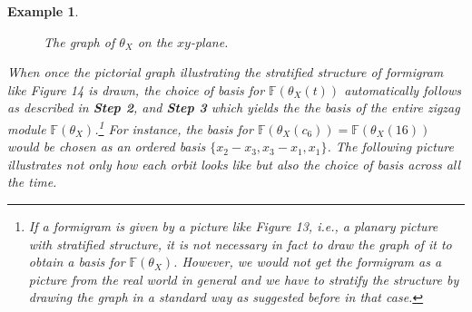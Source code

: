 \documentclass[a4paper,12pt]{article}
\newtheorem{example}{Example}[section]
\begin{document}
\begin{example}
\begin{figure}
	\caption{The graph of $\theta_X$ on the $xy$-plane. }
\end{figure}

When once the pictorial graph illustrating the stratified structure of formigram like Figure 14 is drawn, the choice of basis for $\mathbb{F}(\theta_X(t))$ automatically follows as described in \textbf{Step 2}, and \textbf{Step 3} which yields the the basis of the entire zigzag module $\mathbb{F}(\theta_X)$.\footnote{If a formigram is given by a picture like Figure 13, i.e., a planary picture with stratified structure, it is not necessary in fact to draw the graph of it to obtain a basis for $\mathbb{F}(\theta_X)$. %
However, we would not get the formigram as a picture from the real world in general and we have to stratify the structure by drawing the graph in a standard way as suggested before in that case.} For instance, the basis for $\mathbb{F}(\theta_X(c_6))=\mathbb{F}(\theta_X(16))$ would be chosen as an ordered basis $\{x_2-x_3, x_3-x_1, x_1\}$. The following picture illustrates not only how each orbit looks like but also the choice of basis across all the time.
	\begin{center}
		\begin{figure}[h]
\end{figure}
\end{center}
\end{example}
\end{document}
